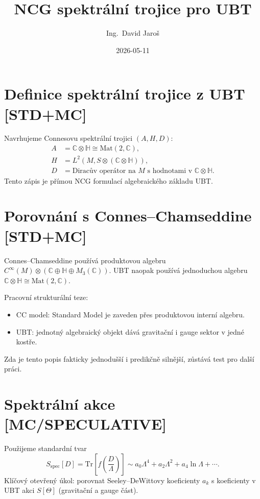 \documentclass[12pt,a4paper]{article}
\title{\textbf{NCG spektrální trojice pro UBT}}
\author{Ing.\ David Jaro\v{s}}
\date{2026-05-11}
\begin{document}
\maketitle

\section{Definice spektrální trojice z UBT \,[STD+MC]}

Navrhujeme Connesovu spektrální trojici $(A,H,D)$:
\begin{align}
A &= \mathbb C\otimes\mathbb H \cong \mathrm{Mat}(2,\mathbb C),\\
H &= L^2(M,S\otimes(\mathbb C\otimes\mathbb H)),\\
D &= \text{Diracův operátor na }M\text{ s hodnotami v }\mathbb C\otimes\mathbb H.
\end{align}
Tento zápis je přímou NCG formulací algebraického základu UBT.

\section{Porovnání s Connes--Chamseddine \,[STD+MC]}

Connes--Chamseddine používá produktovou algebru
$C^\infty(M)\otimes(\mathbb C\oplus\mathbb H\oplus M_3(\mathbb C))$.
UBT naopak používá jednoduchou algebru
$\mathbb C\otimes\mathbb H\cong \mathrm{Mat}(2,\mathbb C)$.

Pracovní strukturální teze:
\begin{itemize}
  \item CC model: Standard Model je zaveden přes produktovou interní algebru.
  \item UBT: jednotný algebraický objekt dává gravitační i gauge sektor v jedné
  kostře.
\end{itemize}
Zda je tento popis fakticky jednodušší i predikčně silnější, zůstává test
pro další práci.

\section{Spektrální akce \,[MC/SPECULATIVE]}

Použijeme standardní tvar
\[
S_{\mathrm{spec}}[D]=\mathrm{Tr}\!\left[f\!\left(\frac{D}{\Lambda}\right)\right]
\sim a_0\Lambda^4+a_2\Lambda^2+a_4\ln\Lambda+\cdots.
\]
Klíčový otevřený úkol: porovnat Seeley--DeWittovy koeficienty $a_k$ s
koeficienty v UBT akci $S[\Theta]$ (gravitační a gauge část).
\end{document}
